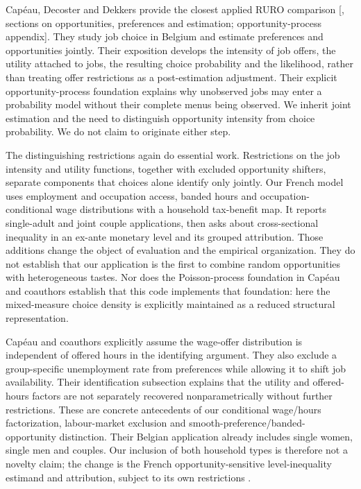 \documentclass[11pt,a4paper]{article}
\begin{document}
Capéau, Decoster and Dekkers provide the closest applied RURO comparison {[}\citet{capeau2016}, sections on opportunities, preferences and estimation; opportunity-process appendix{]}. They study job choice in Belgium and estimate preferences and opportunities jointly. Their exposition develops the intensity of job offers, the utility attached to jobs, the resulting choice probability and the likelihood, rather than treating offer restrictions as a post-estimation adjustment. Their explicit opportunity-process foundation explains why unobserved jobs may enter a probability model without their complete menus being observed. We inherit joint estimation and the need to distinguish opportunity intensity from choice probability. We do not claim to originate either step.

The distinguishing restrictions again do essential work. Restrictions on the job intensity and utility functions, together with excluded opportunity shifters, separate components that choices alone identify only jointly. Our French model uses employment and occupation access, banded hours and occupation-conditional wage distributions with a household tax-benefit map. It reports single-adult and joint couple applications, then asks about cross-sectional inequality in an ex-ante monetary level and its grouped attribution. Those additions change the object of evaluation and the empirical organization. They do not establish that our application is the first to combine random opportunities with heterogeneous tastes. Nor does the Poisson-process foundation in Capéau and coauthors establish that this code implements that foundation: here the mixed-measure choice density is explicitly maintained as a reduced structural representation.

Capéau and coauthors explicitly assume the wage-offer distribution is independent of offered hours in the identifying argument. They also exclude a group-specific unemployment rate from preferences while allowing it to shift job availability. Their identification subsection explains that the utility and offered-hours factors are not separately recovered nonparametrically without further restrictions. These are concrete antecedents of our conditional wage/hours factorization, labour-market exclusion and smooth-preference/banded-opportunity distinction. Their Belgian application already includes single women, single men and couples. Our inclusion of both household types is therefore not a novelty claim; the change is the French opportunity-sensitive level-inequality estimand and attribution, subject to its own restrictions \citep[identification and empirical-application subsections]{capeau2016}.
\end{document}
